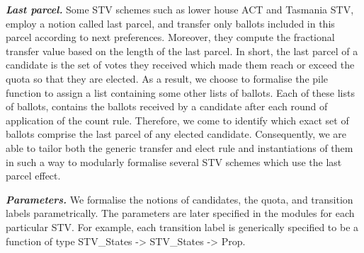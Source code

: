 \documentclass{llncs}
\begin{document}
\textbf{\emph{Last parcel.}} Some STV schemes such as lower house ACT and Tasmania STV, employ a notion called last parcel, and transfer only ballots included in this parcel according to next preferences. Moreover, they compute the fractional transfer value based on the length of the last parcel. In short, the last parcel of a candidate is the set of votes they received which made them reach or exceed the quota so that they are elected. As a result, we choose to formalise the pile function to assign a list containing some other lists of ballots. Each of these lists of ballots, contains the ballots received by a candidate after each round of application of the count rule. Therefore, we come to identify which exact set of ballots comprise the last parcel of any elected candidate. Consequently, we are able to tailor both the generic transfer and elect rule and instantiations of them in such a way to modularly formalise several STV schemes which use the last parcel effect.


\textbf{\emph{Parameters.}} 
We formalise the notions of candidates, the quota, and transition labels parametrically. The parameters are later specified in the modules for each particular STV. For example, each transition label is generically specified to be a function of type {\selectfont STV\_States -> STV\_States -> Prop}.  
\end{document}

